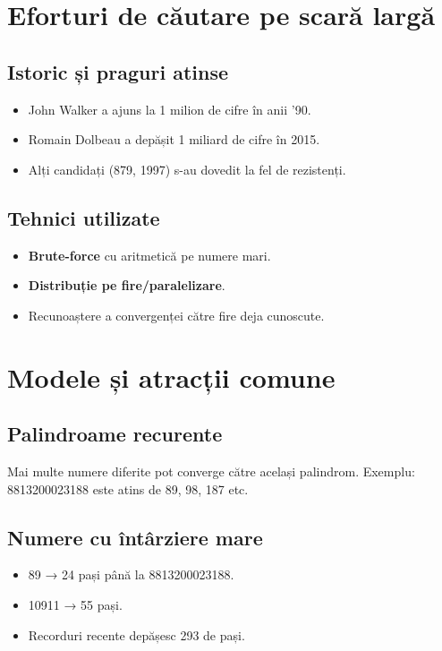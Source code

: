 \documentclass[12pt]{article}
\begin{document}
\section{Eforturi de căutare pe scară largă}
\subsection{Istoric și praguri atinse}
\begin{itemize}
    \item John Walker a ajuns la 1 milion de cifre în anii ’90.
    \item Romain Dolbeau a depășit 1 miliard de cifre în 2015.
    \item Alți candidați (879, 1997) s-au dovedit la fel de rezistenți.
\end{itemize}

\subsection{Tehnici utilizate}
\begin{itemize}
    \item \textbf{Brute-force} cu aritmetică pe numere mari.
    \item \textbf{Distribuție pe fire/paralelizare}.
    \item Recunoaștere a convergenței către fire deja cunoscute.
\end{itemize}

\section{Modele și atracții comune}
\subsection{Palindroame recurente}
Mai multe numere diferite pot converge către același palindrom. Exemplu: 8813200023188 este atins de 89, 98, 187 etc.

\subsection{Numere cu întârziere mare}
\begin{itemize}
    \item 89 → 24 pași până la 8813200023188.
    \item 10911 → 55 pași.
    \item Recorduri recente depășesc 293 de pași.
\end{itemize}
\end{document}
